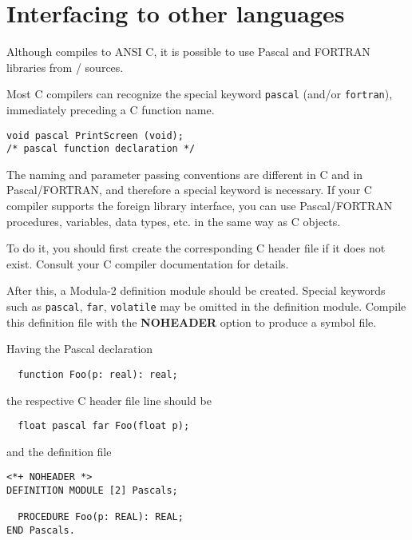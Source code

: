 \fi %

\ifcomment %

\section{Interfacing to other languages}

Although \xds{} compiles to ANSI C, it is possible to use {Pascal} and
{FORTRAN} libraries from \mt{}/\ot{} sources.

Most C compilers can recognize the special keyword {\tt pascal}
(and/or {\tt fortran}), immediately preceding a C function name.

\begin{verbatim}
void pascal PrintScreen (void);
/* pascal function declaration */
\end{verbatim}

The naming and parameter passing conventions are different in
C and in {Pascal}/{FORTRAN}, and therefore a special keyword is necessary.
If your C compiler supports the foreign library interface, you can use
{Pascal}/{FORTRAN} procedures, variables, data types, etc. in the
same way as C objects.

To do it, you should first create the corresponding C header file if it
does not exist. Consult your C compiler documentation for details.

After this, a Modula-2 definition module should be created.
Special keywords such as {\tt pascal}, {\tt far}, {\tt volatile} may
be omitted in the definition module.
Compile this definition file with the {\bf NOHEADER}
option to produce a symbol file.

Having the Pascal declaration
\begin{verbatim}
  function Foo(p: real): real;
\end{verbatim}
the respective C header file line should be
\begin{verbatim}
  float pascal far Foo(float p);
\end{verbatim}

and the definition file
\begin{verbatim}
<*+ NOHEADER *>
DEFINITION MODULE [2] Pascals;

  PROCEDURE Foo(p: REAL): REAL;
END Pascals.
\end{verbatim}

\fi %
